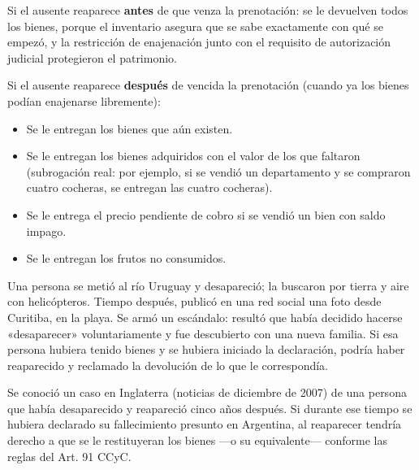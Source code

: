 \documentclass[12pt,oneside]{book}
\begin{document}
Si el ausente reaparece \textbf{antes} de que venza la prenotación: se le
devuelven todos los bienes, porque el inventario asegura que se sabe
exactamente con qué se empezó, y la restricción de enajenación junto con
el requisito de autorización judicial protegieron el patrimonio.

Si el ausente reaparece \textbf{después} de vencida la prenotación
(cuando ya los bienes podían enajenarse libremente):

\begin{itemize}
    \item Se le entregan los bienes que aún existen.
    \item Se le entregan los bienes adquiridos con el valor de los que faltaron (subrogación real: por ejemplo, si se vendió un departamento y se compraron cuatro cocheras, se entregan las cuatro cocheras).
    \item Se le entrega el precio pendiente de cobro si se vendió un bien con saldo impago.
    \item Se le entregan los frutos no consumidos.
\end{itemize}

\begin{ejemplo}
Una persona se metió al río Uruguay y desapareció; la buscaron por tierra
y aire con helicópteros. Tiempo después, publicó en una red social una
foto desde Curitiba, en la playa. Se armó un escándalo: resultó que había
decidido hacerse «desaparecer» voluntariamente y fue descubierto con
una nueva familia. Si esa persona hubiera tenido bienes y se hubiera
iniciado la declaración, podría haber reaparecido y reclamado la
devolución de lo que le correspondía.
\end{ejemplo}

\begin{ejemplo}
Se conoció un caso en Inglaterra (noticias de diciembre de 2007) de una
persona que había desaparecido y reapareció cinco años después. Si
durante ese tiempo se hubiera declarado su fallecimiento presunto en
Argentina, al reaparecer tendría derecho a que se le restituyeran los
bienes ---o su equivalente--- conforme las reglas del Art. 91 CCyC.
\end{ejemplo}

\end{document}

